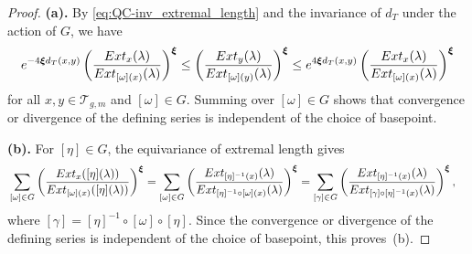 \documentclass[10pt,a4paper]{amsart}
\newcommand{\convgenus}{{\boldsymbol \xi}}
\newcommand{\ext}{{\rm Ext}}
\newcommand{\teich}{\mathcal{T}}
\begin{document}
\begin{proof}
\textbf{(a).}
By \eqref{eq:QC-inv_extremal_length} and the invariance of $d_T$ under the action of $G$, we have
\[
e^{-4\convgenus d_T(x,y)}
\left(
\frac{\ext_x(\lambda)}
{\ext_{[\omega](x)}(\lambda)}
\right)^{\convgenus}
\le
\left(
\frac{\ext_y(\lambda)}
{\ext_{[\omega](y)}(\lambda)}
\right)^{\convgenus}
\le
e^{4\convgenus d_T(x,y)}
\left(
\frac{\ext_x(\lambda)}
{\ext_{[\omega](x)}(\lambda)}
\right)^{\convgenus}
\]
for all $x,y\in\teich_{g,m}$ and $[\omega]\in G$.
Summing over $[\omega]\in G$ shows that convergence or divergence
of the defining series is independent of the choice of basepoint.

\medskip
\noindent
\textbf{(b).}
For $[\eta]\in G$, the equivariance of extremal length gives
\begin{align*}
&\sum_{[\omega]\in G}
\left(
\frac{\ext_x([\eta](\lambda))}
     {\ext_{[\omega](x)}([\eta](\lambda))}
\right)^{\convgenus} =
\sum_{[\omega]\in G}
\left(
\frac{\ext_{[\eta]^{-1}(x)}(\lambda)}
     {\ext_{[\eta]^{-1}\circ[\omega](x)}(\lambda)}
\right)^{\convgenus}=
\sum_{[\gamma]\in G}
\left(
\frac{\ext_{[\eta]^{-1}(x)}(\lambda)}
     {\ext_{[\gamma]\circ[\eta]^{-1}(x)}(\lambda)}
\right)^{\convgenus},
\end{align*}
where $[\gamma]=[\eta]^{-1}\circ[\omega]\circ[\eta]$.
Since the convergence or divergence of the defining series is independent of the choice of basepoint, this proves~(b).
\end{proof}
\end{document}
